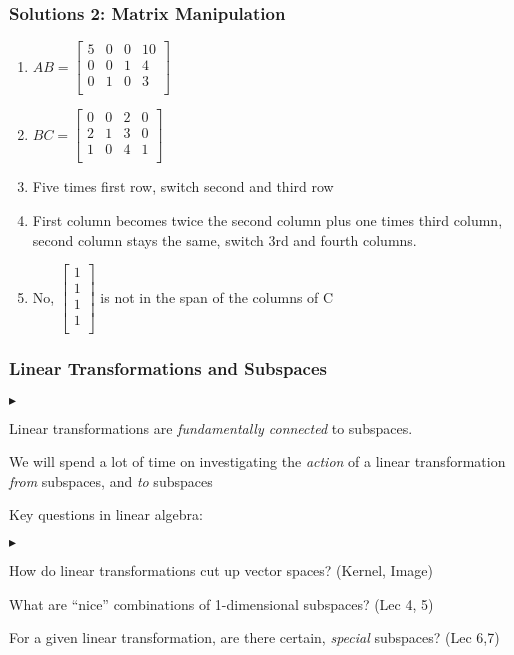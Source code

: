 \documentclass[table]{beamer}
\renewenvironment{itemize}
\renewenvironment{enumerate}%
{\begin{list}{\arabic{enumi}.}%
      {\setlength{\leftmargin}{2.5em}%
       \setlength{\itemsep}{-\parsep}%
       \setlength{\topsep}{-\parskip}%
       \usecounter{enumi}}%
 }{\end{list}}
\renewenvironment{itemize}%
{\begin{list}{$\blacktriangleright$}%
      {\setlength{\leftmargin}{2.5em}%
       \setlength{\itemsep}{-\parsep}%
       \setlength{\topsep}{-\parskip}%
       \usecounter{enumi}}%
 }{\end{list}}
\begin{document}
\begin{frame}
\frametitle{Solutions 2: Matrix Manipulation}
\begin{solution}
\begin{enumerate}
  \item $AB = \begin{bmatrix}
			5 & 0 & 0 & 10  \\
			0 & 0 & 1 & 4   \\
			0 & 1 & 0 & 3   \\
			\end{bmatrix}$
  \item $BC = \begin{bmatrix}
			0 & 0 & 2 & 0  \\
			2 & 1 & 3 & 0   \\
			1 & 0 & 4 & 1  \\
			\end{bmatrix}$
  \item Five times first row, switch second and third row
  \item First column becomes twice the second column plus one times third column, second column stays the same, switch 3rd and fourth columns.
  \item No, $\begin{bmatrix}
  1 \\
  1 \\
  1 \\
  1 \\
  \end{bmatrix}$ is not in the span of the columns of C
  \end{enumerate}
\end{solution}
\end{frame}

\begin{frame}
\frametitle{Linear Transformations and Subspaces}
\begin{itemize}
\item Linear transformations are \textit{fundamentally connected} to subspaces.
\item We will spend a lot of time on investigating the \textit{action} of a linear transformation 
\textit{from} subspaces, and \textit{to} subspaces\\
\medskip
\item Key questions in linear algebra: 
\begin{itemize}
\item How do linear transformations cut up vector spaces? (Kernel, Image)
\item What are ``nice'' combinations of 1-dimensional subspaces? (Lec 4, 5)
\item For a given linear transformation, are there certain, \textit{special} subspaces? (Lec 6,7) 
\end{itemize}
\end{itemize}
\end{frame}
\end{document}
